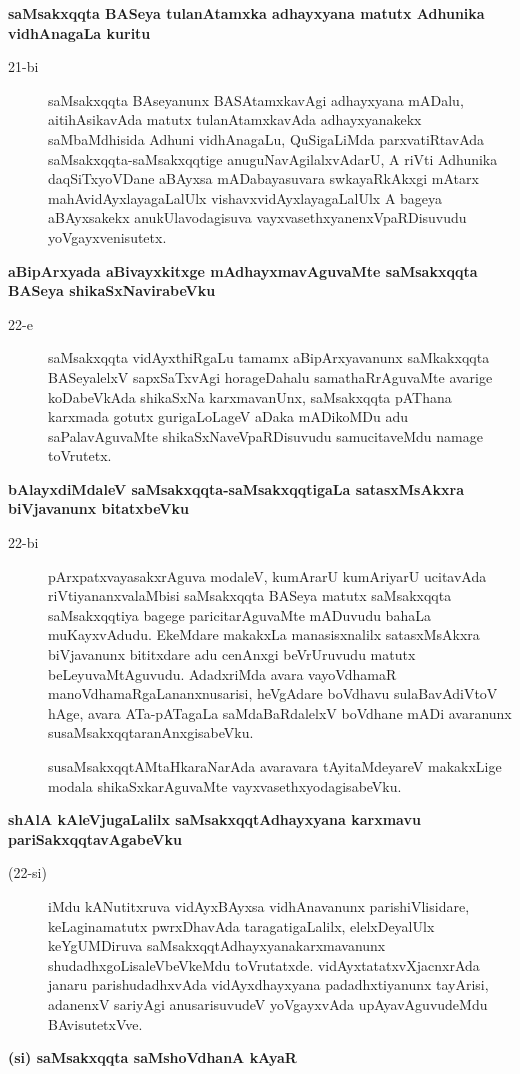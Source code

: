 {\bigskip
\noindent
{\large\bf saMsakxqqta BASeya tulanAtamxka adhayxyana matutx Adhunika vidhAnagaLa kuritu}}\label{page52}
\begin{description}
\item[21-bi] saMsakxqqta BAseyanunx BASAtamxkavAgi adhayxyana mADalu, aitihAsikavAda matutx tulanAtamxkavAda adhayxyanakekx saMbaMdhisida Adhuni vidhAnagaLu, QuSigaLiMda parxvatiRtavAda saMsakxqqta-saMsakxqqtige anuguNa\-vAgilalx\-vAdarU, A riVti Adhu\-nika daqSiTx\-yoVDane aBAyxsa mADa\-bayasu\-vara swkayaR\-kAkxgi mAtarx mahAvidAyxlayagaLalUlx vishavxvidAyxlayagaLalUlx A bageya aBAyx\-sakekx anu\-kUla\-voda\-gisuva vayxvasethxyanenxVpaRDisuvudu yoVgayxvenisutetx.
\end{description}
{\noindent
{\large\bf aBipArxyada aBivayxkitxge mAdhayxmavAguvaMte saMsakxqqta BASeya shikaSxNavirabeVku}}\label{page52}
\begin{description}
\item[22-e] saMsakxqqta vidAyxthiRgaLu tamamx aBipArxyavanunx saMkakxqqta BASeyalelxV sapxSaTxvAgi hora\-geDa\-halu sama\-thaR\-rAgu\-vaMte avarige koDa\-beVkAda shikaSxNa karxma\-vanUnx, saMsakxqqta pAThana karxmada gotutx guri\-gaLo\-LageV aDaka mADi\-koMDu adu saPala\-vAgu\-vaMte shikaSxNa\-veVpaRDisu\-vudu samucita\-veMdu namage toVrutetx.
\end{description}
{\noindent
{\large\bf bAlayxdiMdaleV saMsakxqqta-saMsakxqqtigaLa satasxMsAkxra biVjavanunx bitatxbeVku}}\label{page53}
\begin{description}
\item[22-bi] pArxpatxvayasakxrAguva modaleV, kumArarU kumAriyarU ucitavAda riVti\-yananx\-va\-laMbisi saMsakxqqta BASeya matutx saMsakxqqta saMsakxqqtiya bagege paricitarAguvaMte mADuvudu bahaLa muKayxvAdudu. EkeMdare makakxLa manasisxnalilx satasxMsAkxra biVjavanunx bititxdare adu cenAnxgi beVrUru\-vudu matutx beLeyuvaMtAguvudu. AdadxriMda avara vayoVdhamaR manoV\-dhamaR\-gaLa\-nanxnu\-sarisi, heVgAdare boVdhavu sulaBavAdiVtoV hAge, avara ATa-pATagaLa saMdaBaRdalelxV boV\-dhane mADi avaranunx susaMsakxqqtaranAnxgisabeVku.

susaMsakxqqtAMtaHkaraNarAda avaravara tAyitaMdeyareV makakxLige modala shikaSxkarAguvaMte vayxva\-sethxyodagisabeVku.
\end{description}
{\noindent
{\large\bf shAlA kAleVjugaLalilx saMsakxqqtAdhayxyana karxmavu pariSakxqqtavAgabeVku}}\label{page53}
\begin{description}
\item[(22-si)] iMdu kANutitxruva vidAyxBAyxsa vidhAnavanunx parishiVlisidare, keLagina\break matutx pwrxDhavAda taragati\-gaLalilx, elelxDeyalUlx keYgUMDiruva saMsakxqqtA\-dhayx\-yanakarxmavanunx shudadhxgoLisaleVbeVkeMdu toVrutatxde. vidAyxtatatxvXjacnxrAda janaru parishudadhxvAda vidAyxdhayxyana padadhxtiyanunx tayArisi,
adanenxV sari\-yAgi anusarisuvudeV yoVgayxvAda upAyavAguvudeMdu BAvisu\-tetxVve.
\end{description}
{\noindent
{\large\bf (si) saMsakxqqta saMshoVdhanA kAyaR}}\label{page53}

